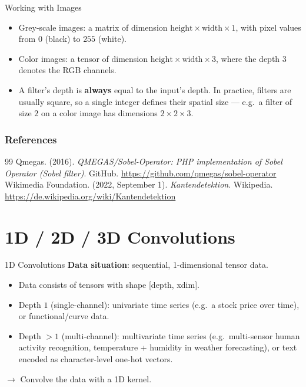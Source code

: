 \begin{frame}{Working with Images}
  \begin{itemize}
  \item Grey-scale images: a matrix of dimension $\text{height} \times \text{width} \times 1$, with pixel values from $0$ (black) to $255$ (white).
  \item Color images: a tensor of dimension $\text{height} \times \text{width} \times 3$, where the depth $3$ denotes the RGB channels.
  \item A filter's depth is \textbf{always} equal to the input's depth. In practice, filters are usually square, so a single integer defines their spatial size --- e.g.\ a filter of size $2$ on a color image has dimensions $2\times 2\times 3$.
  \end{itemize}
\end{frame}
\begin{vbframe}
\frametitle{References}
\footnotesize{
\begin{thebibliography}{99}
 Qmegas. (2016). \textit{QMEGAS/Sobel-Operator: PHP implementation of Sobel Operator (Sobel filter)}. GitHub. \url{https://github.com/qmegas/sobel-operator}
 Wikimedia Foundation. (2022, September 1). \textit{Kantendetektion}. Wikipedia. \url{https://de.wikipedia.org/wiki/Kantendetektion}
\end{thebibliography}
}
\end{vbframe}

\section{1D / 2D / 3D Convolutions}

\begin{vbframe}{1D Convolutions}
\textbf{Data situation}: sequential, 1-dimensional tensor data.

\begin{itemize}
\item Data consists of tensors with shape [depth, xdim].
\item Depth $1$ (single-channel): univariate time series (e.g.\ a stock price over time), or functional/curve data.
\item Depth $> 1$ (multi-channel): multivariate time series (e.g.\ multi-sensor human activity recognition, temperature + humidity in weather forecasting), or text encoded as character-level one-hot vectors.
\end{itemize}

$\to$ Convolve the data with a 1D kernel.
\end{vbframe}

